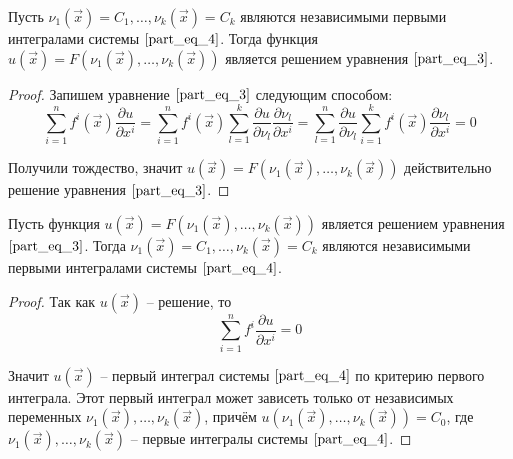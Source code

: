 \begin{theorem}
    Пусть $\nu_1 \left( \overrightarrow{x} \right) = C_1, \dots, \nu_k \left( \overrightarrow{x} \right) = C_k$ являются независимыми первыми интегралами системы $\eqref{part_eq_4}$. Тогда функция $u \left( \overrightarrow{x} \right) = F \left( \nu_1 \left( \overrightarrow{x} \right), \dots, \nu_k \left( \overrightarrow{x} \right) \right) $ является решением уравнения $\eqref{part_eq_3}$.
\end{theorem}
\begin{proof}
    Запишем уравнение $\eqref{part_eq_3}$ следующим способом:
    \begin{equation*}
        \sum \limits_{i = 1}^{n} f^{i} \left( \overrightarrow{x} \right)  \frac{\partial u}{\partial x^{i}} = \sum \limits_{i = 1}^{n} f^{i} \left( \overrightarrow{x} \right)  \sum \limits_{l = 1}^{k} \frac{\partial u}{\partial \nu_l} \frac{\partial \nu_l}{\partial x^{i}} = \sum \limits_{l = 1}^{n} \frac{\partial u}{\partial \nu_l} \sum \limits_{i = 1}^{k} f^{i} \left( \overrightarrow{x} \right)  \frac{\partial \nu_l}{\partial x^{i}} = 0
    \end{equation*}

    Получили тождество, значит $u \left( \overrightarrow{x} \right) = F \left( \nu_1 \left( \overrightarrow{x} \right), \dots, \nu_k \left( \overrightarrow{x} \right) \right)$ действительно решение уравнения $\eqref{part_eq_3}$.
\end{proof}

\begin{theorem}
    Пусть функция $u \left( \overrightarrow{x} \right) = F \left( \nu_1 \left( \overrightarrow{x} \right), \dots, \nu_k \left( \overrightarrow{x} \right) \right)$ является решением уравнения $\eqref{part_eq_3}$. Тогда $\nu_1 \left( \overrightarrow{x} \right) = C_1, \dots, \nu_k \left( \overrightarrow{x} \right) = C_k$ являются независимыми первыми интегралами системы $\eqref{part_eq_4}$. 
\end{theorem}
\begin{proof}
    Так как $u \left( \overrightarrow{x} \right)$ -- решение, то 
    \begin{equation*}
        \sum \limits_{i = 1}^{n} f^i \frac{\partial u}{\partial x^i} = 0
    \end{equation*}

    Значит $u \left( \overrightarrow{x} \right)$ -- первый интеграл системы $\eqref{part_eq_4}$ по критерию первого интеграла. Этот первый интеграл может зависеть только от независимых переменных $\nu_1 \left( \overrightarrow{x} \right), \dots, \nu_k \left( \overrightarrow{x} \right)$, причём $u \left( \nu_1 \left( \overrightarrow{x} \right), \dots, \nu_k \left( \overrightarrow{x} \right) \right) = C_0$, где $\nu_1 \left( \overrightarrow{x} \right), \dots, \nu_k \left( \overrightarrow{x} \right)$ -- первые интегралы системы $\eqref{part_eq_4}$.
\end{proof}


